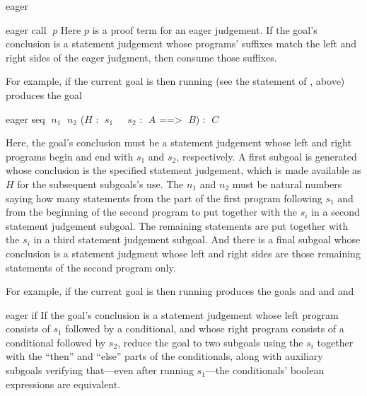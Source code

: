 \begin{tactic}{eager}
  \begin{tsyntax}{eager call $\;p$}
    Here $p$ is a proof term for an eager judgement. If the goal's
    conclusion is a \prhl statement judgement whose programs' suffixes
    match the left and right sides of the eager judgment, then consume
    those suffixes.

  \medskip
  For example, if the current goal is
   then
  running 
  (see the statement of , above)
  produces the goal
  \end{tsyntax}

  \begin{tsyntax}{eager seq $\;n_1$ $\;n_2$ ($H$ : $\;s_1$ ~ $\;s_2$ :
    $\;A$ ==> $\;B$) : $\;C$}

   Here, the goal's conclusion must be a \prhl statement
  judgement whose left and right programs begin and end with $s_1$ and
  $s_2$, respectively. A first subgoal is generated whose conclusion
  is the specified \prhl statement judgement, which is made available
  as $H$ for the subsequent subgoals's use.  The $n_1$ and $n_2$ must
  be natural numbers saying how many statements from the part of the
  first program following $s_1$ and from the beginning of the second
  program to put together with the $s_i$ in a second \prhl statement
  judgement subgoal. The remaining statements are put together with
  the $s_i$ in a third \prhl statement judgement subgoal. And there is
  a final subgoal whose conclusion is a \prhl statement judgment whose
  left and right sides are those remaining statements of the second
  program only.

  \medskip
  For example, if the current goal is
   then
  running 
  produces the goals
  and
  and
  and
  \end{tsyntax}

  \begin{tsyntax}{eager if}
    If the goal's conclusion is a \prhl statement judgement whose left
    program consists of $s_1$ followed by a conditional, and whose
    right program consists of a conditional followed by $s_2$, reduce
    the goal to two subgoals using the $s_i$ together with the ``then''
    and ``else'' parts of the conditionals, along with auxiliary subgoals
    verifying that---even after running $s_1$---the conditionals'
    boolean expressions are equivalent.


\end{tsyntax}
\end{tactic}
